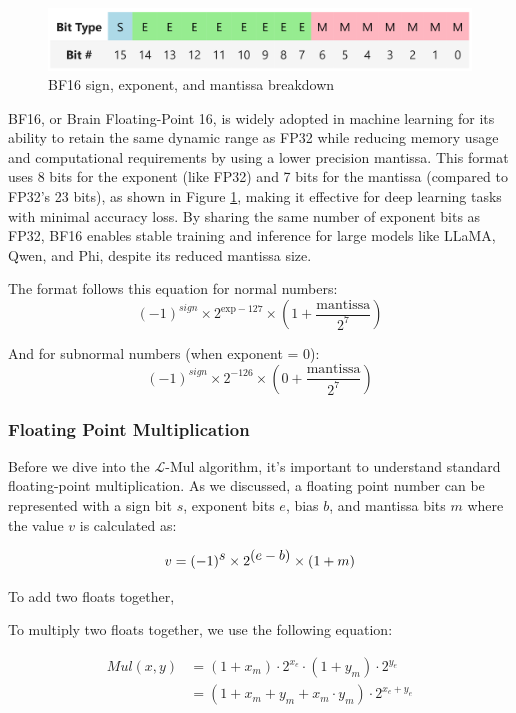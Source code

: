 \documentclass[12pt,letterpaper]{article}
\newcommand{\lmul}{$\mathcal{L}$-Mul\xspace}
\begin{document}
\begin{figure}[htbp]
    \centering
    \includegraphics[width=0.75\linewidth]{q1_checkpoint/bf16.png}
    \caption{BF16 sign, exponent, and mantissa breakdown}
    \label{fig:BF16}
\end{figure}

BF16, or Brain Floating-Point 16, is widely adopted in machine learning for its ability to retain the same dynamic range as FP32 while reducing memory usage and computational requirements by using a lower precision mantissa. This format uses 8 bits for the exponent (like FP32) and 7 bits for the mantissa (compared to FP32's 23 bits), as shown in Figure \ref{fig:BF16}, making it effective for deep learning tasks with minimal accuracy loss. By sharing the same number of exponent bits as FP32, BF16 enables stable training and inference for large models like LLaMA, Qwen, and Phi, despite its reduced mantissa size.

The format follows this equation for normal numbers:
$$ (-1)^{\textstyle{sign}} × 2^{\text{exp} - 127} × (1 + \frac{\text{mantissa}}{2^7}) $$

And for subnormal numbers (when exponent = 0):
$$ (-1)^{\textstyle{sign}} × 2^{-126} × (0 + \frac{\text{mantissa}}{2^7}) $$

\subsubsection*{Floating Point Multiplication}

Before we dive into the \lmul algorithm, it's important to understand standard floating-point multiplication. As we discussed, a floating point number can be represented with a sign bit $s$, exponent bits $e$, bias $b$, and mantissa bits $m$ where the value $v$ is calculated as:

$$
v = (-1)^{\textstyle s} \times 2^{\textstyle (e-b)} \times (1+m) \\
$$

To add two floats together,

To multiply two floats together, we use the following equation:

\begin{align*}
    Mul(x, y) &= (1 + x_m) \cdot 2^{x_e} \cdot (1 + y_m) \cdot 2^{y_e} \\
    &= (1 + x_m + y_m + x_m \cdot y_m) \cdot 2^{x_e + y_e} 
\end{align*}
\end{document}
